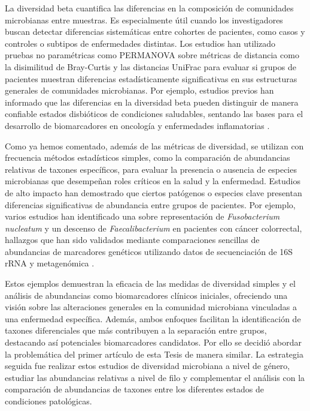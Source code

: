 La diversidad beta cuantifica las diferencias en la composición de comunidades microbianas entre muestras. Es especialmente útil cuando los investigadores buscan detectar diferencias sistemáticas entre cohortes de pacientes, como casos y controles o subtipos de enfermedades distintas. Los estudios han utilizado pruebas no paramétricas como PERMANOVA sobre métricas de distancia como la disimilitud de Bray-Curtis y las distancias UniFrac para evaluar si grupos de pacientes muestran diferencias estadísticamente significativas en sus estructuras generales de comunidades microbianas. Por ejemplo, estudios previos han informado que las diferencias en la diversidad beta pueden distinguir de manera confiable estados disbióticos de condiciones saludables, sentando las bases para el desarrollo de biomarcadores en oncología y enfermedades inflamatorias \cite{yilmaz2019microbial}. 

Como ya hemos comentado, además de las métricas de diversidad, se utilizan con frecuencia métodos estadísticos simples, como la comparación de abundancias relativas de taxones específicos, para evaluar la presencia o ausencia de especies microbianas que desempeñan roles críticos en la salud y la enfermedad. Estudios de alto impacto han demostrado que ciertos patógenos o especies clave presentan diferencias significativas de abundancia entre grupos de pacientes. Por ejemplo, varios estudios han identificado una sobre representación de \textit{Fusobacterium nucleatum} y un descenso de \textit{Faecalibacterium} en pacientes con cáncer colorrectal, hallazgos que han sido validados mediante comparaciones sencillas de abundancias de marcadores genéticos utilizando datos de secuenciación de 16S rRNA y metagenómica \cite{yu2017metagenomic, forbes2018comparative}.



Estos ejemplos demuestran la eficacia de las medidas de diversidad simples y el análisis de abundancias como biomarcadores clínicos iniciales, ofreciendo una visión sobre las alteraciones generales en la comunidad microbiana vinculadas a una enfermedad específica. Además, ambos enfoques facilitan la identificación de taxones diferenciales que más contribuyen a la separación entre grupos, destacando así potenciales biomarcadores candidatos. Por ello se decidió abordar la problemática del primer artículo   de esta Tesis de manera similar. La estrategia seguida fue realizar estos estudios de diversidad microbiana a nivel de género, estudiar las abundancias relativas a nivel de filo y complementar el análisis con la comparación de abundancias de taxones entre los diferentes estados de condiciones patológicas. 

